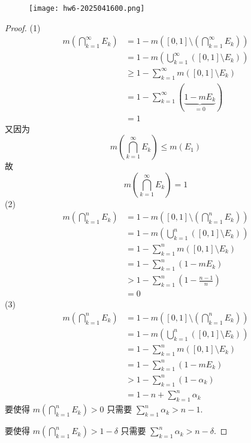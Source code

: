 \begin{exercise}
\begin{figure}[H]
\centering
\texttt{[image: hw6-2025041600.png]}
\label{}
\end{figure}
\end{exercise}
\begin{proof}
(1)
\[
\begin{aligned}
m\left( \bigcap_{k=1}^{\infty} E_k \right) & =1-m\left( [0,1]\setminus\left( \bigcap_{k=1}^{\infty} E_k \right) \right) \\
 & =1-m\left( \bigcup_{k=1}^{\infty} ([0,1]\setminus E_k) \right) \\
 & \geq 1-\sum_{k=1}^{\infty} m([0,1]\setminus E_k) \\
 & =1-\sum_{k=1}^{\infty} (\underbrace{ 1-mE_k }_{ =0 }) \\
 & =1
\end{aligned}
\]
又因为
\[
m\left( \bigcap_{k=1}^{\infty} E_k \right)\leq m(E_1)
\]
故
\[
m\left( \bigcap_{k=1}^{\infty}  E_k\right)=1
\]
(2)
\[
\begin{aligned}
m\left( \bigcap_{k=1}^{n} E_k \right) & =1-m\left( [0,1]\setminus\left( \bigcap_{k=1}^{n} E_k \right) \right) \\
 & =1-m\left( \bigcup_{k=1}^{n} ([0,1]\setminus E_k) \right) \\
 & =1-\sum_{k=1}^{n} m([0,1]\setminus E_k) \\
 & =1-\sum_{k=1}^{n} (1-mE_k) \\
 & >1-\sum_{k=1}^{n} \left( 1-\frac{n-1}{n} \right) \\
 & =0
\end{aligned}
\]
(3)
\[
\begin{aligned}
m\left( \bigcap_{k=1}^{n} E_k \right) & =1-m\left( [0,1]\setminus\left( \bigcap_{k=1}^{n} E_k \right) \right) \\
 & =1-m\left( \bigcup_{k=1}^{n} ([0,1]\setminus E_k) \right) \\
 & =1-\sum_{k=1}^{n} m([0,1]\setminus E_k) \\
 & =1-\sum_{k=1}^{n} (1-mE_k) \\
 & >1-\sum_{k=1}^{n} \left( 1-\alpha _k \right) \\
 & =1-n+\sum_{k=1}^{n} \alpha _k
\end{aligned}
\]
要使得 $m\left( \bigcap_{k=1}^{n}E_k \right)>0$ 只需要 $\sum_{k=1}^{n}\alpha _k>n-1$.

要使得 $m\left( \bigcap_{k=1}^{n}E_k \right)>1-\delta$ 只需要 $\sum_{k=1}^{n}\alpha _k>n-\delta$.
\end{proof}

